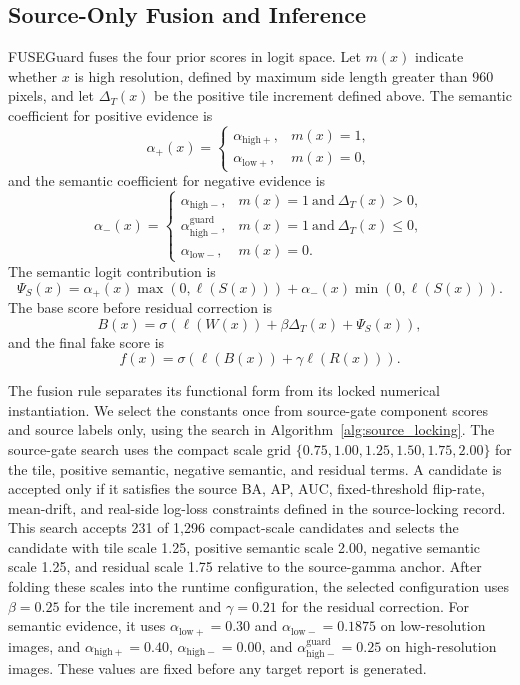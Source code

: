 \documentclass[lettersize,journal]{IEEEtran}
\begin{document}
\subsection{Source-Only Fusion and Inference}
\label{sec:method_fusion}

FUSEGuard fuses the four prior scores in logit space. Let $m(x)$ indicate whether $x$ is high resolution, defined by maximum side length greater than 960 pixels, and let $\Delta_T(x)$ be the positive tile increment defined above. The semantic coefficient for positive evidence is
\[
    \alpha_{+}(x)=
    \begin{cases}
    \alpha_{\mathrm{high}+}, & m(x)=1,\\
    \alpha_{\mathrm{low}+}, & m(x)=0,
    \end{cases}
\]
and the semantic coefficient for negative evidence is
\[
    \alpha_{-}(x)=
    \begin{cases}
    \alpha_{\mathrm{high}-}, & m(x)=1 \ \mathrm{and}\ \Delta_T(x)>0,\\
    \alpha_{\mathrm{high}-}^{\mathrm{guard}}, & m(x)=1 \ \mathrm{and}\ \Delta_T(x)\leq 0,\\
    \alpha_{\mathrm{low}-}, & m(x)=0.
    \end{cases}
\]
The semantic logit contribution is
\[
    \Psi_S(x)=\alpha_{+}(x)\max(0,\ell(S(x)))+
    \alpha_{-}(x)\min(0,\ell(S(x))).
\]
The base score before residual correction is
\[
    B(x)=\sigma\left(\ell(W(x))+\beta \Delta_T(x)+\Psi_S(x)\right),
\]
and the final fake score is
\[
    f(x)=\sigma\left(\ell(B(x))+\gamma \ell(R(x))\right).
\]

The fusion rule separates its functional form from its locked numerical instantiation. We select the constants once from source-gate component scores and source labels only, using the search in Algorithm~\ref{alg:source_locking}. The source-gate search uses the compact scale grid $\{0.75,1.00,1.25,1.50,1.75,2.00\}$ for the tile, positive semantic, negative semantic, and residual terms. A candidate is accepted only if it satisfies the source BA, AP, AUC, fixed-threshold flip-rate, mean-drift, and real-side log-loss constraints defined in the source-locking record. This search accepts 231 of 1,296 compact-scale candidates and selects the candidate with tile scale 1.25, positive semantic scale 2.00, negative semantic scale 1.25, and residual scale 1.75 relative to the source-gamma anchor. After folding these scales into the runtime configuration, the selected configuration uses $\beta=0.25$ for the tile increment and $\gamma=0.21$ for the residual correction. For semantic evidence, it uses $\alpha_{\mathrm{low}+}=0.30$ and $\alpha_{\mathrm{low}-}=0.1875$ on low-resolution images, and $\alpha_{\mathrm{high}+}=0.40$, $\alpha_{\mathrm{high}-}=0.00$, and $\alpha_{\mathrm{high}-}^{\mathrm{guard}}=0.25$ on high-resolution images. These values are fixed before any target report is generated.
\end{document}
